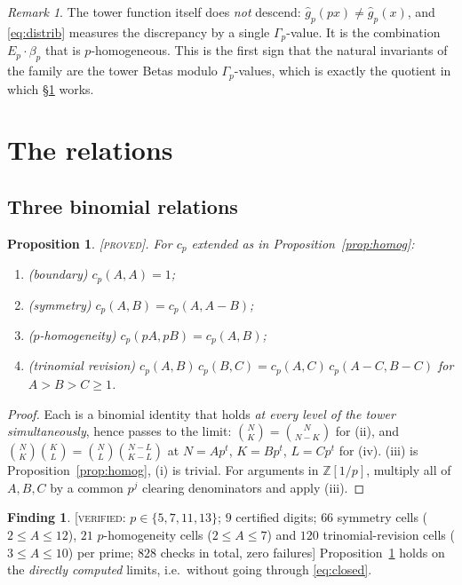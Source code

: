 \documentclass[11pt,reqno]{article}
\newcommand{\ZZ}{\mathbb{Z}}
\newcommand{\Gp}{\Gamma_p}
\newcommand{\gh}{\widehat{g}_p}
\newcommand{\bet}{\beta_p}
\newcommand{\bin}[2]{\binom{#1}{#2}}
\newcommand{\PROVED}{{\normalfont\textsc{[proved]}}}
\newcommand{\VER}[1]{{\normalfont\textsc{[verified:} #1\textsc{]}}}
\theoremstyle{plain}
\newtheorem{proposition}[theorem]{Proposition}
\theoremstyle{definition}
\newtheorem{finding}[theorem]{Finding}
\theoremstyle{remark}
\newtheorem{remark}[theorem]{Remark}
\numberwithin{equation}{section}
\begin{document}
\begin{remark}
The tower function itself does \emph{not} descend: $\gh(px)\ne\gh(x)$, and
\eqref{eq:distrib} measures the discrepancy by a single $\Gp$-value.  It is the
combination $E_p\cdot\bet$ that is $p$-homogeneous.  This is the first sign that
the natural invariants of the family are the tower Betas modulo $\Gp$-values,
which is exactly the quotient in which \S\ref{sec:relations} works.
\end{remark}

\section{The relations}\label{sec:relations}

\subsection{Three binomial relations}

\begin{proposition}\label{prop:binrels}
\PROVED.  For $c_p$ extended as in Proposition~\ref{prop:homog}:
\begin{enumerate}[label=(\roman*),leftmargin=2em]
\item (boundary) $c_p(A,A)=1$;
\item (symmetry) $c_p(A,B)=c_p(A,A-B)$;
\item ($p$-homogeneity) $c_p(pA,pB)=c_p(A,B)$;
\item (trinomial revision) $c_p(A,B)\,c_p(B,C)=c_p(A,C)\,c_p(A-C,B-C)$ for
  $A>B>C\ge1$.
\end{enumerate}
\end{proposition}

\begin{proof}
Each is a binomial identity that holds \emph{at every level of the tower
simultaneously}, hence passes to the limit: $\bin{N}{K}=\bin{N}{N-K}$ for (ii),
and
$\bin{N}{K}\bin{K}{L}=\bin{N}{L}\bin{N-L}{K-L}$ at $N=Ap^t$, $K=Bp^t$,
$L=Cp^t$ for (iv).  (iii) is Proposition~\ref{prop:homog}, (i) is trivial.  For
arguments in $\ZZ[1/p]$, multiply all of $A,B,C$ by a common $p^j$ clearing
denominators and apply (iii).
\end{proof}

\begin{finding}\label{find:rels}
\VER{$p\in\{5,7,11,13\}$; $9$ certified digits; $66$ symmetry cells
($2\le A\le12$), $21$ $p$-homogeneity cells ($2\le A\le7$) and $120$
trinomial-revision cells ($3\le A\le10$) per prime; $828$ checks in total, zero
failures}  Proposition~\ref{prop:binrels} holds on the \emph{directly computed}
limits, i.e.\ without going through \eqref{eq:closed}.
\end{finding}
\end{document}
